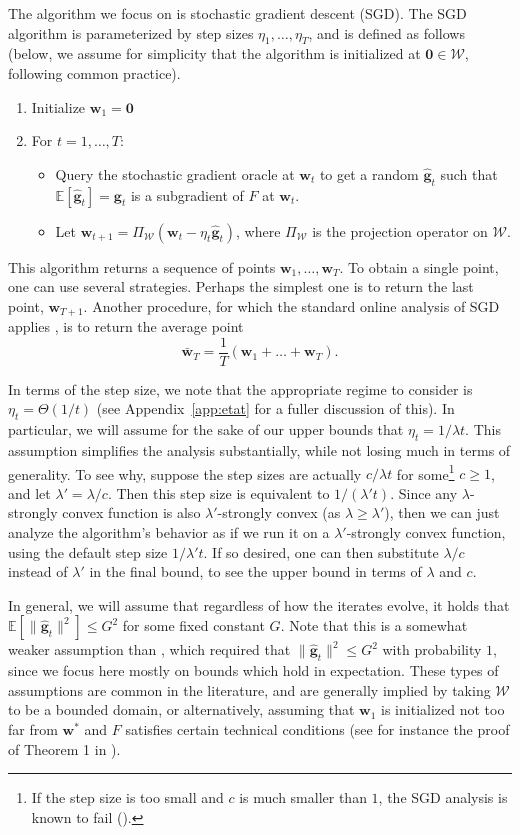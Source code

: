 \documentclass{article}
\newcommand{\E}{\mathbb{E}}
\newcommand{\bw}{\mathbf{w}}
\newcommand{\bg}{\mathbf{g}}
\newcommand{\Wcal}{\mathcal{W}}
\newcommand{\norm}[1]{\|#1\|}
\newcommand{\appref}[1]{Appendix~\ref{#1}}
\begin{document}
The algorithm we focus on is stochastic gradient descent (SGD). The SGD algorithm is parameterized by step sizes $\eta_1,\ldots,\eta_T$, and is defined as follows (below, we assume for simplicity that the algorithm is initialized at $\mathbf{0}\in \Wcal$, following common practice).
\begin{enumerate}
    \item Initialize $\bw_1=\mathbf{0}$
    \item For $t=1,\ldots,T$:
    \begin{itemize}
        \item Query the stochastic gradient oracle at $\bw_t$ to get a random $\hat{\bg}_t$ such that $\E[\hat{\bg}_t]=\bg_t$ is a subgradient of $F$ at $\bw_t$.
        \item Let $\bw_{t+1}=\Pi_{\Wcal}(\bw_t-\eta_t \hat{\bg}_t)$, where $\Pi_{\Wcal}$ is the projection operator on $\Wcal$.
    \end{itemize}
\end{enumerate}
This algorithm returns a sequence of points $\bw_1,\ldots,\bw_T$. To obtain a single point, one can use several strategies. Perhaps the simplest one is to return the last point, $\bw_{T+1}$. Another procedure, for which the standard online analysis of SGD applies \cite{HazAgKal07}, is to return the average point
\[
\bar{\bw}_T = \frac{1}{T}(\bw_1+\ldots+\bw_T).
\]

In terms of the step size, we note that the appropriate regime to consider is $\eta_t=\Theta(1/t)$ (see \appref{app:etat} for a fuller discussion of this). In particular, we will assume for the sake of our upper bounds that $\eta_t = 1/\lambda t$. This assumption simplifies the analysis substantially, while not losing much in terms of generality. To see why, suppose the step sizes are actually $c/\lambda t$ for some\footnote{If the step size is too small and $c$ is much smaller than $1$, the SGD analysis is known to fail (\cite{JuLaNeSha09}).} $c\geq 1$, and let $\lambda' = \lambda/c$. Then this step size is equivalent to $1/(\lambda't)$. Since any $\lambda$-strongly convex function is also $\lambda'$-strongly convex (as $\lambda \geq \lambda'$), then we can just analyze the algorithm's behavior as if we run it on a $\lambda'$-strongly convex function, using the default step size $1/\lambda' t$. If so desired, one can then substitute $\lambda/c$ instead of $\lambda'$ in the final bound, to see the upper bound in terms of $\lambda$ and $c$.

In general, we will assume that regardless of how the iterates evolve, it holds that $\E[\norm{\hat{\bg}_t}^2]\leq G^2$ for some fixed constant $G$. Note that this is a somewhat weaker assumption than \cite{HazanKa11}, which required that $\norm{\hat{\bg}_t}^2\leq G^2$ with probability $1$, since we focus here mostly on bounds which hold in expectation. These types of assumptions are common in the literature, and are generally implied by taking $\Wcal$ to be a bounded domain, or alternatively, assuming that $\bw_1$ is initialized not too far from $\bw^{*}$ and $F$ satisfies certain technical conditions (see for instance the proof of Theorem 1 in \cite{ShaSiSreCo11}).
\end{document}
